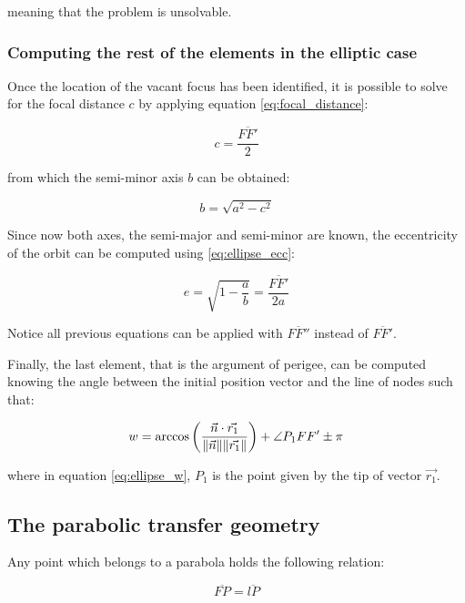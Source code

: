 meaning that the problem is unsolvable.

\subsubsection{Computing the rest of the elements in the elliptic case}
Once the location of the vacant focus has been identified, it is possible to
solve for the focal distance $c$ by applying equation \ref{eq:focal_distance}:

\begin{equation}
  c = \frac{\overline{FF'}}{2}
  \label{eq:focal_distance}
\end{equation}

from which the semi-minor axis $b$ can be obtained:

\begin{equation}
  b = \sqrt{a^2 - c^2}
  \label{eq:focal_distance}
\end{equation}

Since now both axes, the semi-major and semi-minor are known, the eccentricity
of the orbit can be computed using \ref{eq:ellipse_ecc}:

\begin{equation}
  e = \sqrt{1 - \frac{a}{b}} = \frac{\overline{FF'}}{2a}
  \label{eq:ellipse_ecc}
\end{equation}

Notice all previous equations can be applied with $\overline{FF''}$ instead of
$\overline{FF'}$.

Finally, the last element, that is the argument of perigee, can be computed
knowing the angle between the initial position vector and the line of nodes such
that:

\begin{equation}
  w = \arccos{\left(\frac{\vec{n} \cdot \vec{r_{1}}}{\lVert\vec{n}\rVert
      \lVert\vec{r_{1}}\rVert} \right) + \angle P_{1}FF' \pm \pi}
  \label{eq:ellipse_w}
\end{equation}

where in equation \ref{eq:ellipse_w}, $P_{1}$ is the point given by the tip of
vector $\vec{r_{1}}$.

\subsection{The parabolic transfer geometry}

Any point which belongs to a parabola holds the following relation:

\begin{equation}
  \overline{FP} = \overline{lP}
  \label{eq:parabola_property}
\end{equation}

